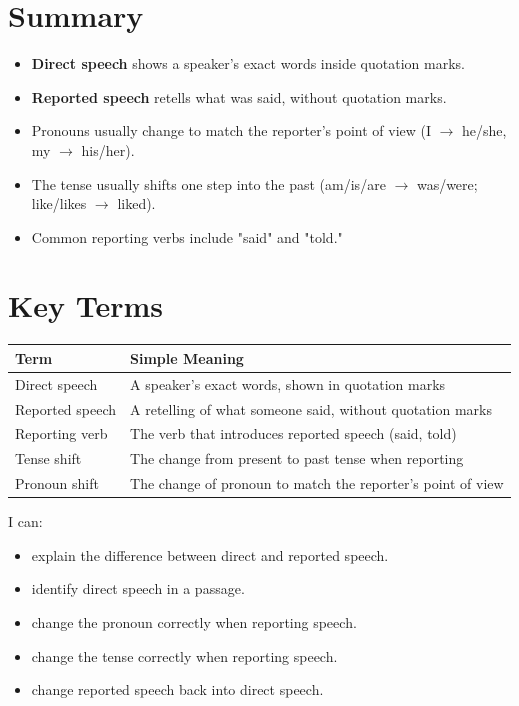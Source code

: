 \section{Summary}
\begin{summarybox}
\begin{itemize}
    \item \textbf{Direct speech} shows a speaker's exact words inside quotation marks.
    \item \textbf{Reported speech} retells what was said, without quotation marks.
    \item Pronouns usually change to match the reporter's point of view (I $\rightarrow$ he/she, my $\rightarrow$ his/her).
    \item The tense usually shifts one step into the past (am/is/are $\rightarrow$ was/were; like/likes $\rightarrow$ liked).
    \item Common reporting verbs include "said" and "told."
\end{itemize}
\end{summarybox}

\section{Key Terms}
\begin{table}[h!]
\centering
\begin{tabular}{|l|l|}
\hline
\textbf{Term} & \textbf{Simple Meaning} \\
\hline
Direct speech & A speaker's exact words, shown in quotation marks \\
Reported speech & A retelling of what someone said, without quotation marks \\
Reporting verb & The verb that introduces reported speech (said, told) \\
Tense shift & The change from present to past tense when reporting \\
Pronoun shift & The change of pronoun to match the reporter's point of view \\
\hline
\end{tabular}
\end{table}

\begin{selfcheck}
I can:
\begin{itemize}
    \item explain the difference between direct and reported speech.
    \item identify direct speech in a passage.
    \item change the pronoun correctly when reporting speech.
    \item change the tense correctly when reporting speech.
    \item change reported speech back into direct speech.
\end{itemize}
\end{selfcheck}